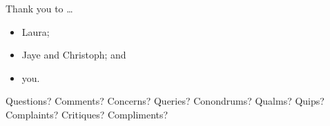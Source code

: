 \pause

Thank you to \ldots \pause

\begin{itemize}
    \item Laura; \pause
    \item Jaye and Christoph; \pause and
    \item you.
\end{itemize}
\pause

\bigskip

Questions? Comments? Concerns? Queries? Conondrums? Qualms? Quips? Complaints? Critiques? Compliments? 
